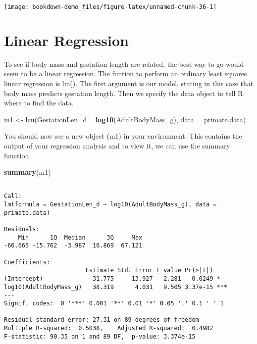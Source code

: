 \documentclass[]{book}
\newenvironment{Shaded}{\begin{snugshade}}{\end{snugshade}}
\newcommand{\KeywordTok}[1]{\textcolor[rgb]{0.13,0.29,0.53}{\textbf{#1}}}
\newcommand{\DataTypeTok}[1]{\textcolor[rgb]{0.13,0.29,0.53}{#1}}
\newcommand{\StringTok}[1]{\textcolor[rgb]{0.31,0.60,0.02}{#1}}
\newcommand{\OperatorTok}[1]{\textcolor[rgb]{0.81,0.36,0.00}{\textbf{#1}}}
\newcommand{\NormalTok}[1]{#1}
\begin{document}
\begin{center}\texttt{[image: bookdown-demo\_files/figure-latex/unnamed-chunk-36-1]} \end{center}

\section{Linear Regression}\label{linear-regression}

To see if body mass and gestation length are related, the best way to go
would seem to be a linear regression. The funtion to perform an ordinary
least squares linear regression is lm(). The first argument is our
model, stating in this case that body mass predicts gestation length.
Then we specify the data object to tell R where to find the data.

\begin{Shaded}
\begin{Highlighting}[]
\NormalTok{m1 <-}\StringTok{ }\KeywordTok{lm}\NormalTok{(GestationLen_d }\OperatorTok{~}\StringTok{ }\KeywordTok{log10}\NormalTok{(AdultBodyMass_g), }\DataTypeTok{data =}\NormalTok{ primate.data)}
\end{Highlighting}
\end{Shaded}

You should now see a new object (m1) in your environment. This contains
the output of your regression analysis and to view it, we can use the
summary function.

\begin{Shaded}
\begin{Highlighting}[]
\KeywordTok{summary}\NormalTok{(m1)}
\end{Highlighting}
\end{Shaded}

\begin{verbatim}

Call:
lm(formula = GestationLen_d ~ log10(AdultBodyMass_g), data = primate.data)

Residuals:
    Min      1Q  Median      3Q     Max 
-66.665 -15.762  -3.987  16.869  67.121 

Coefficients:
                       Estimate Std. Error t value Pr(>|t|)    
(Intercept)              31.775     13.927   2.281   0.0249 *  
log10(AdultBodyMass_g)   38.319      4.031   9.505 3.37e-15 ***
---
Signif. codes:  0 '***' 0.001 '**' 0.01 '*' 0.05 '.' 0.1 ' ' 1

Residual standard error: 27.31 on 89 degrees of freedom
Multiple R-squared:  0.5038,    Adjusted R-squared:  0.4982 
F-statistic: 90.35 on 1 and 89 DF,  p-value: 3.374e-15
\end{verbatim}
\end{document}

